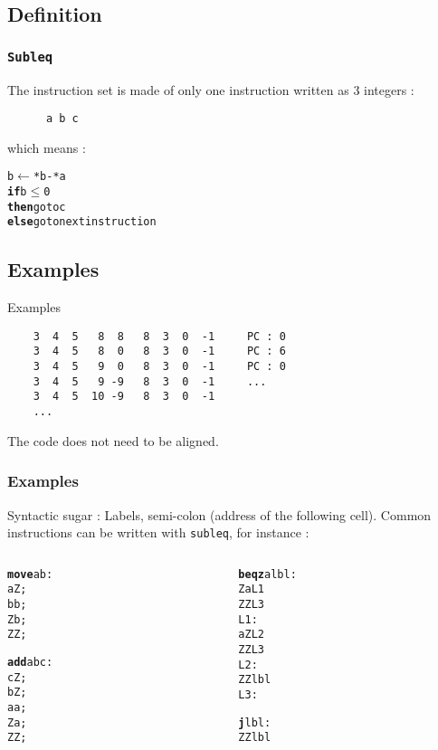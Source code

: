 \documentclass{beamer}
\begin{document}
\subsection{Definition}
\begin{frame}[fragile]
    \frametitle{\texttt{Subleq}}

    The instruction set is made of only one instruction written as 3
    integers :
    \\[11pt]
    \begin{verbatim}
      a b c
    \end{verbatim}
    which means :

    \begin{alltt}
       b \(\leftarrow\) *b - *a
      {\bf if} b \(\leq\) 0
      {\bf then} go to c
      {\bf else} go to next instruction
    \end{alltt}

\end{frame}

\subsection{Examples}
\begin{frame}[fragile]{Examples}
  \begin{verbatim}
    3  4  5   8  8   8  3  0  -1     PC : 0
    3  4  5   8  0   8  3  0  -1     PC : 6
    3  4  5   9  0   8  3  0  -1     PC : 0
    3  4  5   9 -9   8  3  0  -1     ...
    3  4  5  10 -9   8  3  0  -1
    ...
  \end{verbatim}
  The code does not need to be aligned.
\end{frame}

\begin{frame}[fragile]
    \frametitle{Examples}
Syntactic sugar : Labels, semi-colon (address of the following cell).
Common instructions can be written with \texttt{subleq}, for instance :

\begin{columns}[t]
    \begin{column}[T]{3cm}
\begin{alltt}
{\bf move} a b :
   a Z ;
   b b ;
   Z b ;
   Z Z ;

{\bf add} a b c :
   c Z ;
   b Z ;
   a a ;
   Z a ;
   Z Z ;
\end{alltt}
    \end{column}
\begin{column}[T]{3cm}
\begin{alltt}
{\bf beqz} a lbl :
   	Z a L1
   	Z Z L3
 L1:
    a Z L2
    Z Z L3
 L2:
    Z Z lbl
 L3:

{\bf j} lbl :
    Z Z lbl
\end{alltt}
\end{column}
\end{columns}
\end{frame}
\end{document}
